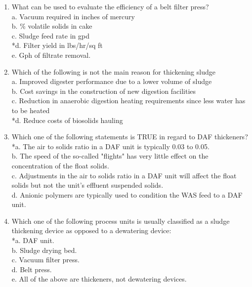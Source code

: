 \documentclass{article}
\begin{document}
\begin{enumerate}
\item  What can be used to evaluate the efficiency of a belt filter press? \\

a. Vacuum required in inches of mercury \\
b. \% volatile solids in cake \\
c. Sludge feed rate in gpd \\
*d. Filter yield in lbs/hr/sq ft \\
e. Gph of filtrate removal. \\

\item  Which of the following is not the main reason for thickening sludge \\

a. Improved digester performance due to a lower volume of sludge \\
b. Cost savings in the construction of new digestion facilities \\
c. Reduction in anaerobic digestion heating requirements since less water has to be heated \\
*d. Reduce costs of biosolids hauling \\

\item  Which one of the following statements is TRUE in regard to DAF thickeners? \\

*a. The air to solids ratio in a DAF unit is typically 0.03 to 0.05. \\
b. The speed of the so-called "flights" has very little effect on the concentration of the float solids. \\
c. Adjustments in the air to solids ratio in a DAF unit will affect the float solids but not the unit's effluent suspended solids. \\
d. Anionic polymers are typically used to condition the WAS feed to a DAF unit. \\

\item  Which one of the following process units is usually classified as a sludge thickening device as opposed to a dewatering device: \\

*a. DAF unit. \\
b. Sludge drying bed. \\
c. Vacuum filter press. \\
d. Belt press. \\
e. All of the above are thickeners, not dewatering devices. \\


\end{enumerate}
\end{document}
